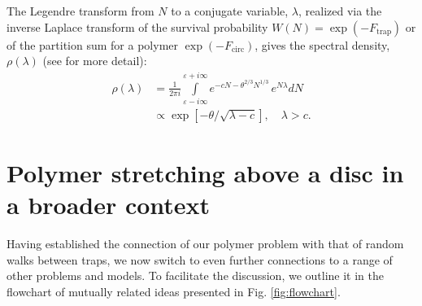 \documentclass[aps,pre,floatfix,twocolumn,nofootinbib]{revtex4-2}
\newcommand{\be}{\begin{equation}}
\newcommand{\ee}{\end{equation}}
\newcommand{\fig}[1]{Fig.~\ref{#1}}
\newcommand{\eps}{\varepsilon}
\begin{document}
The Legendre transform from $N$ to a conjugate variable, $\lambda$, realized via the inverse Laplace transform of the survival probability $W(N) = \exp \left( - F_{\mathrm{trap}} \right)$ or of the partition sum for a polymer $\exp \left( - F_{\mathrm{circ}} \right)$, gives the spectral density, $\rho(\lambda)$ (see \cite{nieuwenhuizen} for more detail):
\be \begin{split}
\rho(\lambda) & = \frac{1}{2\pi i}\int\limits_{\eps-i\infty}^{\eps+i\infty} e^{-c N - \theta^{2/3} N^{1/3}} \, e^{N\lambda} dN  \\ & \propto \exp \left[ -\theta /\sqrt{
\lambda - c} \right], \quad \lambda>c.
\label{eq:35}
\end{split} \ee


\section{Polymer stretching above a disc in a broader context}\label{app_flow}

Having established the connection of our polymer problem with that of random walks between traps, we now switch to even further connections to a range of other problems and models.  To facilitate the discussion, we outline it in the flowchart of mutually related ideas presented in Fig. \ref{fig:flowchart}.

\end{document}
